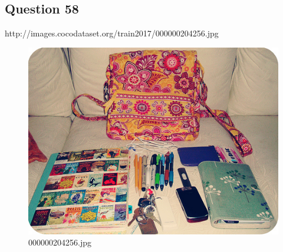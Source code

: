 \subsection*{Question 58}
http://images.cocodataset.org/train2017/000000204256.jpg
\begin{figure}[h]
    \centering
    \includegraphics[width=0.8\linewidth]{../image set/hard/000000204256.jpg}
    \caption{000000204256.jpg}
\end{figure}
